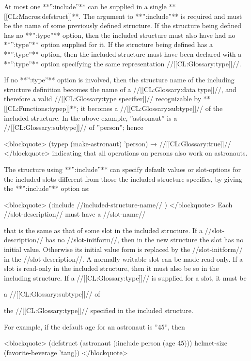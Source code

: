 At most one **'':include''** can be supplied in a single **[[CL:Macros:defstruct]]**. The argument to **'':include''** is required and must be the name of some previously defined structure. If the structure being defined has no **'':type''** option, then the included structure must also have had no **'':type''** option supplied for it. If the structure being defined has a **'':type''** option, then the included structure must have been declared with a **'':type''** option specifying the same representation //[[CL:Glossary:type]]//.

If no **'':type''** option is involved, then the structure name of the including structure definition becomes the name of a //[[CL:Glossary:data type]]//, and therefore a valid //[[CL:Glossary:type specifier]]// recognizable by **[[CL:Functions:typep]]**; it becomes a //[[CL:Glossary:subtype]]// of the included structure. In the above example, ''astronaut'' is a //[[CL:Glossary:subtype]]// of ''person''; hence

<blockquote> (typep (make-astronaut) 'person) → //[[CL:Glossary:true]]// </blockquote> indicating that all operations on persons also work on astronauts.

The structure using **'':include''** can specify default values or slot-options for the included slots different from those the included structure specifies, by giving the **'':include''** option as:

<blockquote> (:include //included-structure-name// ) </blockquote> Each //slot-description// must have a //slot-name//

that is the same as that of some slot in the included structure. If a //slot-description// has no //slot-initform//, then in the new structure the slot has no initial value. Otherwise its initial value form is replaced by the //slot-initform// in the //slot-description//. A normally writable slot can be made read-only. If a slot is read-only in the included structure, then it must also be so in the including structure. If a //[[CL:Glossary:type]]// is supplied for a slot, it must be

a //[[CL:Glossary:subtype]]// of

the //[[CL:Glossary:type]]// specified in the included structure.

For example, if the default age for an astronaut is ''45'', then

<blockquote> (defstruct (astronaut (:include person (age 45))) helmet-size (favorite-beverage 'tang)) </blockquote>

